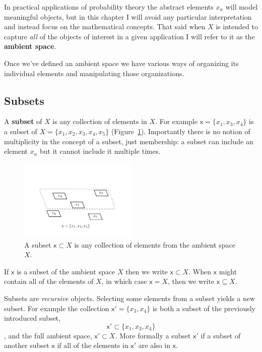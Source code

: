 \documentclass[
  letterpaper,
  DIV=11,
  numbers=noendperiod]{scrartcl}
\begin{document}
In practical applications of probability theory the abstract elements
\(x_{n}\) will model meaningful objects, but in this chapter I will
avoid any particular interpretation and instead focus on the
mathematical concepts. That said when \(X\) is intended to capture
\emph{all} of the objects of interest in a given application I will
refer to it as the \textbf{ambient space}.

Once we've defined an ambient space we have various ways of organizing
its individual elements and manipulating those organizations.

\hypertarget{subsets}{%
\subsection{Subsets}\label{subsets}}

A \textbf{subset} of \(X\) is any collection of elements in \(X\). For
example \(\mathsf{x} = \{x_1, x_3, x_4\}\) is a subset of
\(X = \{x_1, x_2, x_3, x_4, x_5\}\) (Figure~\ref{fig-subset}).
Importantly there is no notion of multiplicity in the concept of a
subset, just membership: a subset can include an element \(x_{n}\) but
it cannot include it multiple times.

\begin{figure}

{\centering \includegraphics[width=0.5\textwidth,height=\textheight]{figures/subset/subset.pdf}

}

\caption{\label{fig-subset}A subset \(\mathsf{x} \subset X\) is any
collection of elements from the ambient space \(X\).}

\end{figure}

If \(\mathsf{x}\) is a subset of the ambient space \(X\) then we write
\(\mathsf{x} \subset X\). When \(\mathsf{x}\) might contain all of the
elements of \(X\), in which case \(\mathsf{x} = X\), then we write
\(\mathsf{x} \subseteq X\).

Subsets are \emph{recursive} objects. Selecting some elements from a
subset yields a new subset. For example the collection
\(\mathsf{x}' = \{x_3, x_4\}\) is both a subset of the previously
introduced subset, \[
\mathsf{x}' \subset \{x_1, x_3, x_4\}
\], and the full ambient space, \(\mathsf{x}' \subset X\). More formally
a subset \(\mathsf{x}'\) if a subset of another subset \(\mathsf{x}\) if
all of the elements in \(\mathsf{x}'\) are also in \(\mathsf{x}\).
\end{document}
